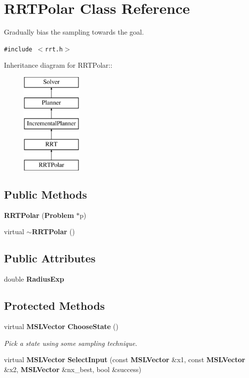 \section{RRTPolar  Class Reference}
\label{classRRTPolar}
Gradually bias the sampling towards the goal. 


{\tt \#include $<$rrt.h$>$}

Inheritance diagram for RRTPolar::\begin{figure}[H]
\begin{center}
\leavevmode
\includegraphics[height=5cm]{classRRTPolar}
\end{center}
\end{figure}
\subsection*{Public Methods}
\begin{CompactItemize}
\item 
{\bf RRTPolar} ({\bf Problem} $\ast$p)
\item 
virtual {\bf $\sim$RRTPolar} ()
\end{CompactItemize}
\subsection*{Public Attributes}
\begin{CompactItemize}
\item 
double {\bf Radius\-Exp}
\end{CompactItemize}
\subsection*{Protected Methods}
\begin{CompactItemize}
\item 
virtual {\bf MSLVector} {\bf Choose\-State} ()
\begin{CompactList}\small\item\em Pick a state using some sampling technique.\item\end{CompactList}\item 
virtual {\bf MSLVector} {\bf Select\-Input} (const {\bf MSLVector} \&x1, const {\bf MSLVector} \&x2, {\bf MSLVector} \&nx\_\-best, bool \&success)
\end{CompactItemize}


